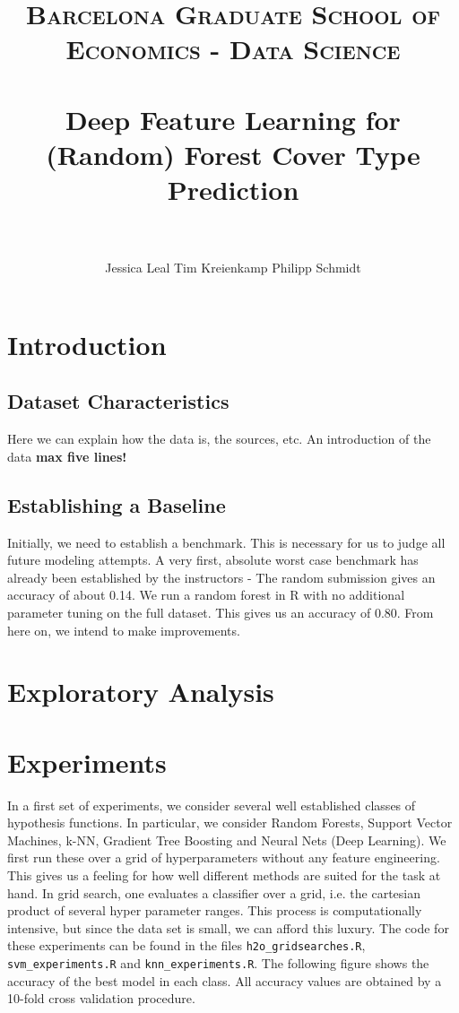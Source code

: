 \documentclass[paper=a4, fontsize=11pt]{scrartcl}
\title{	
\normalfont \normalsize 
\textsc{Barcelona Graduate School of Economics - Data Science} \\ [25pt]
\horrule{2pt} \\[0.5cm] 
\huge Deep Feature Learning for (Random) Forest Cover Type Prediction  \\ 
\horrule{2pt} \\[0.5cm] 
}
\author{Jessica Leal Tim Kreienkamp Philipp Schmidt}
\date{}
\numberwithin{equation}{section} %
\numberwithin{figure}{section} %
\numberwithin{table}{section} %
\begin{document}
\maketitle
\section{Introduction}
\subsection{Dataset Characteristics}
Here we can explain how the data is, the sources, etc. An introduction of the data \textbf{max five lines!}
\subsection{Establishing a Baseline}
Initially, we need to establish a benchmark. This is necessary for us to judge all future modeling attempts. A very first, absolute worst case benchmark has already been established by the instructors - The random submission gives an accuracy of about 0.14. We run a random forest in R with no additional parameter tuning on the full dataset. This gives us an accuracy of 0.80. From here on, we intend to make improvements.

\section{Exploratory Analysis}
\section{Experiments}
In a first set of experiments, we consider several well established classes of hypothesis functions. In particular, we consider Random Forests, Support Vector Machines, k-NN,  Gradient Tree Boosting and Neural Nets (Deep Learning). 
We first run these over a grid of hyperparameters without any feature engineering. This gives us a feeling for how well different methods are suited for the task at hand. In grid search, one evaluates a classifier over a grid, i.e. the cartesian product of several hyper parameter ranges. This process is computationally intensive, but since the data set is small, we can afford this luxury. The code for these experiments can be found in the files \lstinline{h2o_gridsearches.R}, \lstinline{svm_experiments.R} and \lstinline{knn_experiments.R}. The following figure shows the accuracy of the best model in each class. All accuracy values are obtained by a 10-fold cross validation procedure. 
\end{document}
